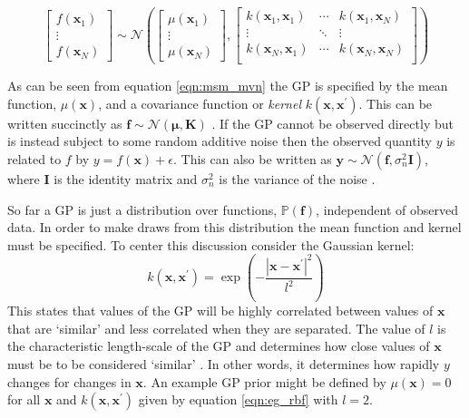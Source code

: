 \begin{equation}
\begin{bmatrix}  f\left(\mathbf{x}_{1}\right) \\ \vdots \\ f\left(\mathbf{x}_{N}\right) \end{bmatrix} 
\sim 
\mathcal{N}\left( 
\begin{bmatrix} \mu\left(\mathbf{x}_{1}\right) \\  \vdots \\ \mu\left(\mathbf{x}_{N}\right) \end{bmatrix}, 
\begin{bmatrix}
k(\mathbf{x}_{1}, \mathbf{x}_{1}) & \cdots & k(\mathbf{x}_{1}, \mathbf{x}_{N}) \\
\vdots & \ddots & \vdots \\
k(\mathbf{x}_{N}, \mathbf{x}_{1}) & \cdots & k(\mathbf{x}_{N}, \mathbf{x}_{N}) \\
\end{bmatrix}
\right)
\end{equation}\label{eqn:msm_mvn}

As can be seen from equation \ref{eqn:msm_mvn} the GP is specified by the mean function, $\mu(\mathbf{x})$, and a covariance function or \emph{kernel} $k(\mathbf{x}, \mathbf{x}^{\prime})$. This can be written succinctly as $\mathbf{f} \sim \mathcal{N}(\bm{\mu}, \mathbf{K})$ \cite{rasmussenGaussianProcessesMachine2006}. If the GP cannot be observed directly but is instead subject to some random additive noise then the observed quantity $y$ is related to $f$ by $y = f(\mathbf{x}) + \epsilon$. This can also be written as $\mathbf{y} \sim \mathcal{N}(\mathbf{f}, \sigma_{n}^{2}\mathbf{I})$, where $\mathbf{I}$ is the identity matrix and $\sigma_{n}^{2}$ is the variance of the noise \cite{rasmussenGaussianProcessesMachine2006}.

So far a GP is just a distribution over functions, $\mathbb{P}(\mathbf{f})$, independent of observed data. In order to make draws from this distribution the mean function and kernel must be specified. To center this discussion consider the Gaussian kernel: 
\begin{equation}\label{eqn:eg_rbf}
    k(\mathbf{x}, \mathbf{x}^{\prime}) = \exp{\left(-\frac{\left|\mathbf{x}-\mathbf{x}^{\prime}\right|^{2}}{l^{2}}\right)}
\end{equation}\label{eqn:msm_rbf}
This states that values of the GP will be highly correlated between values of $\mathbf{x}$ that are `similar' and less correlated when they are separated. The value of $l$ is the characteristic length-scale of the GP and determines how close values of $\mathbf{x}$ must be to be considered `similar' \cite{rasmussenGaussianProcessesMachine2006}. In other words, it determines how rapidly  $y$ changes for changes in $\mathbf{x}$. An example GP prior might be defined by $\mu(\mathbf{x})=0$ for all $\mathbf{x}$ and $k(\mathbf{x}, \mathbf{x}^{\prime})$ given by equation \ref{eqn:eg_rbf} with $l=2$.  

